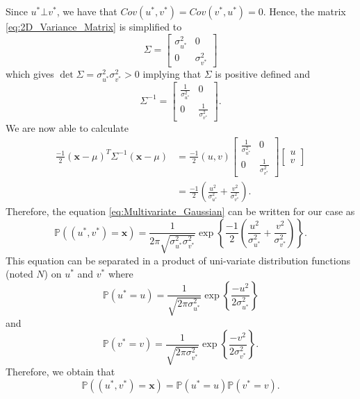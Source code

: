 \documentclass{article}
\begin{document}
Since $u^* \bot v^*$, we have that $Cov(u^*, v^*) = Cov(v^*, u^*) = 0$. Hence, the matrix \eqref{eq:2D_Variance_Matrix} is simplified to
\begin{equation*}
    \Sigma = 
    \begin{bmatrix}
  		\sigma^2_{u^*} & 0 \\
  		0 & \sigma^2_{v^*}
	\end{bmatrix}
\end{equation*}
which gives $\det \Sigma = \sigma^2_{u^*} \sigma^2_{v^*} > 0$ implying that $\Sigma$ is positive defined and
\begin{equation*}
    \Sigma^{-1} =
    \begin{bmatrix}
  		\frac{1}{\sigma^2_{u^*}} & 0 \\
  		0 & \frac{1}{\sigma^2_{v^*}}
	\end{bmatrix}.
\end{equation*}
We are now able to calculate
\begin{align*}
    \frac{-1}{2} (\mathbf{x} - \mu)^T \Sigma^{-1} (\mathbf{x} - \mu) &= \frac{-1}{2} (u, v) \begin{bmatrix}
  		\frac{1}{\sigma^2_{u^*}} & 0 \\
  		0 & \frac{1}{\sigma^2_{v^*}}
	\end{bmatrix}
	\begin{bmatrix}
  		u \\
  		v
	\end{bmatrix} \\
	&= \frac{-1}{2} \left(\frac{u^2}{\sigma^2_{u^*}} + \frac{v^2}{\sigma^2_{v^*}}\right).
\end{align*}
Therefore, the equation \eqref{eq:Multivariate_Gaussian} can be written for our case as
\begin{equation} \label{eq:Bivariate_Gaussian}
    \mathbb{P}((u^*, v^*) = \mathbf{x}) = \frac{1}{2\pi \sqrt{\sigma^2_{u^*} \sigma^2_{v^*}}} \exp\left\{\frac{-1}{2} \left(\frac{u^2}{\sigma^2_{u^*}} + \frac{v^2}{\sigma^2_{v^*}}\right)\right\}.
\end{equation}
This equation can be separated in a product of uni-variate distribution functions (noted $N$) on $u^*$ and $v^*$ where
\begin{equation*}
    \mathbb{P}(u^* = u) = \frac{1}{\sqrt{2\pi \sigma^2_{u^*}}} \exp\left\{ \frac{-u^2}{2\sigma^2_{u^*}}\right\}
\end{equation*}
and 
\begin{equation*}
    \mathbb{P}(v^* = v) = \frac{1}{\sqrt{2\pi \sigma^2_{v^*}}} \exp\left\{ \frac{-v^2}{2\sigma^2_{v^*}}\right\}.
\end{equation*}
Therefore, we obtain that 
\begin{equation} \label{eq:Product_Of_Gaussian}
    \mathbb{P}((u^*, v^*) = \mathbf{x}) = \mathbb{P}(u^* = u) \mathbb{P}(v^* = v).
\end{equation}
\end{document}
